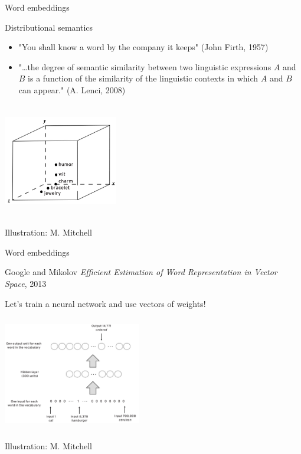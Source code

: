\documentclass[
  10pt,
  ignorenonframetext,
  x11names, dvipsnames, bibspacing,natbib, table]{beamer}
\begin{document}
\begin{frame}{Word embeddings}
\protect\hypertarget{word-embeddings-4}{}
\begin{block}{Distributional semantics}
\protect\hypertarget{distributional-semantics}{}
\begin{itemize}
\item "You shall know a word by the company it keeps" (John Firth, 1957)


\item "\dots the degree of semantic similarity between two linguistic expressions $A$ and $B$ is a function of the similarity of the linguistic contexts in which $A$ and $B$ can appear." (A. Lenci, 2008)


\end{itemize}

\pause

\begin{center}
 \includegraphics[height = 5cm, width = 5cm]{images/similarity1.png}
\end{center}

\vspace{-3mm}

\tiny \hfill \color{gray}Illustration: M. Mitchell \color{black}
\end{block}
\end{frame}

\begin{frame}{Word embeddings}
\protect\hypertarget{word-embeddings-5}{}
\begin{block}{Google and Mikolov}
\protect\hypertarget{google-and-mikolov}{}
\emph{Efficient Estimation of Word Representation in Vector Space}, 2013

Let's train a neural network and use vectors of weights!

\begin{center}
 \includegraphics[height = 5cm, width = 6cm]{images/word2vec1.png}
\end{center}

\vspace{-3mm}

\tiny \hfill \color{gray}Illustration: M. Mitchell \color{black}
\end{block}
\end{frame}
\end{document}
